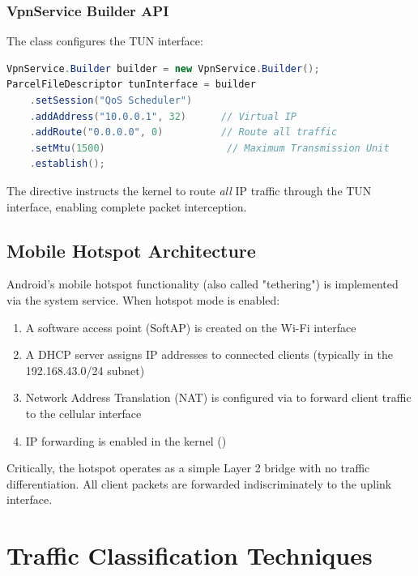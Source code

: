\subsubsection{VpnService Builder API}

The  class configures the TUN interface:

\begin{lstlisting}[language=Java, caption={VpnService Configuration}, label={lst:vpn-builder}]
VpnService.Builder builder = new VpnService.Builder();
ParcelFileDescriptor tunInterface = builder
    .setSession("QoS Scheduler")
    .addAddress("10.0.0.1", 32)      // Virtual IP
    .addRoute("0.0.0.0", 0)          // Route all traffic
    .setMtu(1500)                     // Maximum Transmission Unit
    .establish();
\end{lstlisting}

The  directive instructs the kernel to route \emph{all} IP traffic through the TUN interface, enabling complete packet interception.

\subsection{Mobile Hotspot Architecture}

Android's mobile hotspot functionality (also called "tethering") is implemented via the  system service. When hotspot mode is enabled:

\begin{enumerate}
    \item A software access point (SoftAP) is created on the Wi-Fi interface
    \item A DHCP server assigns IP addresses to connected clients (typically in the 192.168.43.0/24 subnet)
    \item Network Address Translation (NAT) is configured via  to forward client traffic to the cellular interface
    \item IP forwarding is enabled in the kernel ()
\end{enumerate}

Critically, the hotspot operates as a simple Layer 2 bridge with no traffic differentiation. All client packets are forwarded indiscriminately to the uplink interface.

\section{Traffic Classification Techniques}
\label{sec:traffic-classification}


